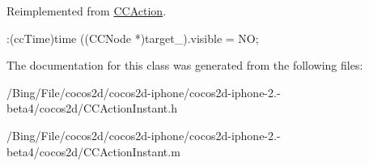 Reimplemented from \hyperlink{interface_c_c_action_a41207f5e0f31713136c8b690fcf166ef}{C\-C\-Action}.


\begin{DoxyCode}
              :(ccTime)time
{
        ((CCNode *)target_).visible = NO;
}
\end{DoxyCode}


The documentation for this class was generated from the following files\-:\begin{DoxyCompactItemize}
\item 
/\-Bing/\-File/cocos2d/cocos2d-\/iphone/cocos2d-\/iphone-\/2.-\/beta4/cocos2d/C\-C\-Action\-Instant.\-h\item 
/\-Bing/\-File/cocos2d/cocos2d-\/iphone/cocos2d-\/iphone-\/2.-\/beta4/cocos2d/C\-C\-Action\-Instant.\-m\end{DoxyCompactItemize}
